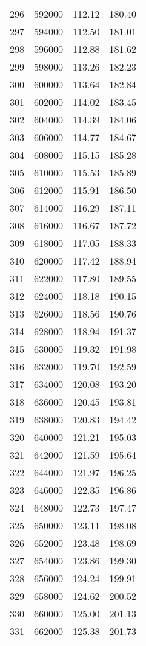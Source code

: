 \documentclass{article}
\begin{document}
\begin{longtable}{@{}l l l l}
296 & 592000 & 112.12 & 180.40\\
297 & 594000 & 112.50 & 181.01\\
298 & 596000 & 112.88 & 181.62\\
299 & 598000 & 113.26 & 182.23\\
300 & 600000 & 113.64 & 182.84\\
301 & 602000 & 114.02 & 183.45\\
302 & 604000 & 114.39 & 184.06\\
303 & 606000 & 114.77 & 184.67\\
304 & 608000 & 115.15 & 185.28\\
305 & 610000 & 115.53 & 185.89\\
306 & 612000 & 115.91 & 186.50\\
307 & 614000 & 116.29 & 187.11\\
308 & 616000 & 116.67 & 187.72\\
309 & 618000 & 117.05 & 188.33\\
310 & 620000 & 117.42 & 188.94\\
311 & 622000 & 117.80 & 189.55\\
312 & 624000 & 118.18 & 190.15\\
313 & 626000 & 118.56 & 190.76\\
314 & 628000 & 118.94 & 191.37\\
315 & 630000 & 119.32 & 191.98\\
316 & 632000 & 119.70 & 192.59\\
317 & 634000 & 120.08 & 193.20\\
318 & 636000 & 120.45 & 193.81\\
319 & 638000 & 120.83 & 194.42\\
320 & 640000 & 121.21 & 195.03\\
321 & 642000 & 121.59 & 195.64\\
322 & 644000 & 121.97 & 196.25\\
323 & 646000 & 122.35 & 196.86\\
324 & 648000 & 122.73 & 197.47\\
325 & 650000 & 123.11 & 198.08\\
326 & 652000 & 123.48 & 198.69\\
327 & 654000 & 123.86 & 199.30\\
328 & 656000 & 124.24 & 199.91\\
329 & 658000 & 124.62 & 200.52\\
330 & 660000 & 125.00 & 201.13\\
331 & 662000 & 125.38 & 201.73\\

\end{longtable}
\end{document}
